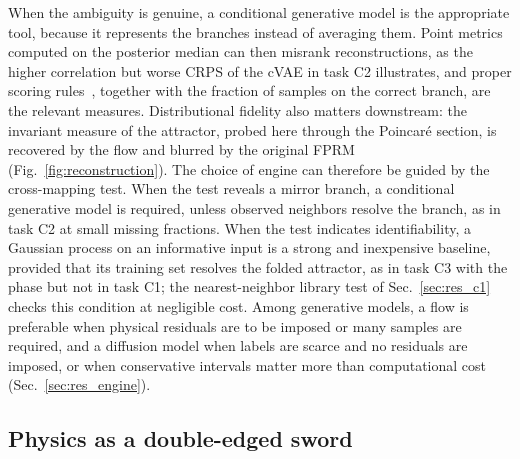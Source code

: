 When the ambiguity is genuine, a conditional generative model is the appropriate tool, because it represents the branches instead of averaging them. Point metrics computed on the posterior median can then misrank reconstructions, as the higher correlation but worse CRPS of the cVAE in task C2 illustrates, and proper scoring rules~\cite{Gneiting2007}, together with the fraction of samples on the correct branch, are the relevant measures. Distributional fidelity also matters downstream: the invariant measure of the attractor, probed here through the Poincar\'e section, is recovered by the flow and blurred by the original FPRM (Fig.~\ref{fig:reconstruction}). The choice of engine can therefore be guided by the cross-mapping test. When the test reveals a mirror branch, a conditional generative model is required, unless observed neighbors resolve the branch, as in task C2 at small missing fractions. When the test indicates identifiability, a Gaussian process on an informative input is a strong and inexpensive baseline, provided that its training set resolves the folded attractor, as in task C3 with the phase but not in task C1; the nearest-neighbor library test of Sec.~\ref{sec:res_c1} checks this condition at negligible cost. Among generative models, a flow is preferable when physical residuals are to be imposed or many samples are required, and a diffusion model when labels are scarce and no residuals are imposed, or when conservative intervals matter more than computational cost (Sec.~\ref{sec:res_engine}).

\subsection{Physics as a double-edged sword}

